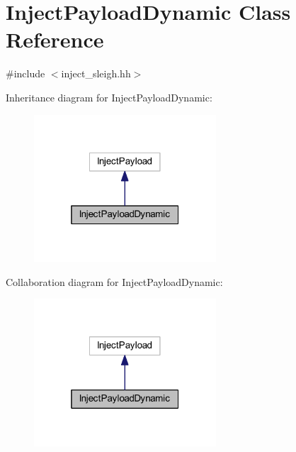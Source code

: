 \hypertarget{class_inject_payload_dynamic}{}\section{Inject\+Payload\+Dynamic Class Reference}
\label{class_inject_payload_dynamic}


{\ttfamily \#include $<$inject\+\_\+sleigh.\+hh$>$}



Inheritance diagram for Inject\+Payload\+Dynamic\+:
\nopagebreak
\begin{figure}[H]
\begin{center}
\leavevmode
\includegraphics[width=193pt]{class_inject_payload_dynamic__inherit__graph}
\end{center}
\end{figure}


Collaboration diagram for Inject\+Payload\+Dynamic\+:
\nopagebreak
\begin{figure}[H]
\begin{center}
\leavevmode
\includegraphics[width=193pt]{class_inject_payload_dynamic__coll__graph}
\end{center}
\end{figure}
